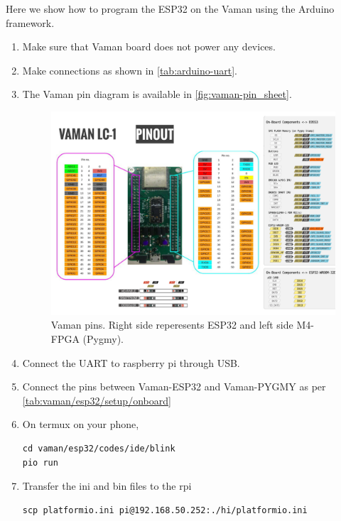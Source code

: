 Here we show how to program the ESP32 on the Vaman using the Arduino framework.
\begin{enumerate}[label=\arabic*.,ref=\theenumi]
\item Make sure that Vaman board does not power any devices.  
\item Make connections as shown in \autoref{tab:arduino-uart}.
\item The Vaman pin diagram is available in \autoref{fig:vaman-pin_sheet}.
\begin{figure}
\centering
\includegraphics[width=\columnwidth]{vaman-esp32/lcd/figs/pin_sheet.png}
	\caption{Vaman pins.  Right side reperesents ESP32 and left side M4-FPGA (Pygmy).}
\label{fig:vaman-pin_sheet}
\end{figure}
\begin{table}[!ht]

\caption{}
\label{tab:arduino-uart}
\end{table}
%
\item Connect the UART to raspberry pi through USB.  
\item Connect the pins between Vaman-ESP32 and Vaman-PYGMY as per \autoref{tab:vaman/esp32/setup/onboard}
\begin{table}[h]
\centering

\caption{}
\label{tab:vaman/esp32/setup/onboard}
\end{table}
\item On termux on your phone, 
\begin{lstlisting}
cd vaman/esp32/codes/ide/blink
pio run
\end{lstlisting}
\item Transfer the ini and bin files to the rpi 
\begin{lstlisting}
scp platformio.ini pi@192.168.50.252:./hi/platformio.ini


\end{lstlisting}
\end{enumerate}

